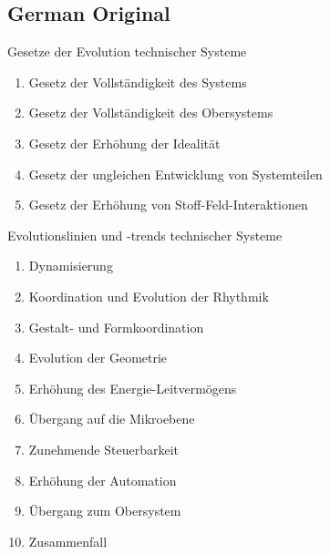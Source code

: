 \documentclass[11pt,a4paper]{article}
\begin{document}
\subsection*{German Original}

Gesetze der Evolution technischer Systeme
\begin{enumerate}\itemsep0pt
\item Gesetz der Vollständigkeit des Systems
\item Gesetz der Vollständigkeit des Obersystems
\item Gesetz der Erhöhung der Idealität
\item Gesetz der ungleichen Entwicklung von Systemteilen
\item Gesetz der Erhöhung von Stoff-Feld-Interaktionen
\end{enumerate}

Evolutionslinien und -trends technischer Systeme
\begin{enumerate}\itemsep0pt
\item Dynamisierung
\item Koordination und Evolution der Rhythmik
\item Gestalt- und Formkoordination
\item Evolution der Geometrie
\item Erhöhung des Energie-Leitvermögens
\item Übergang auf die Mikroebene
\item Zunehmende Steuerbarkeit
\item Erhöhung der Automation
\item Übergang zum Obersystem
\item Zusammenfall
\end{enumerate}
\end{document}
